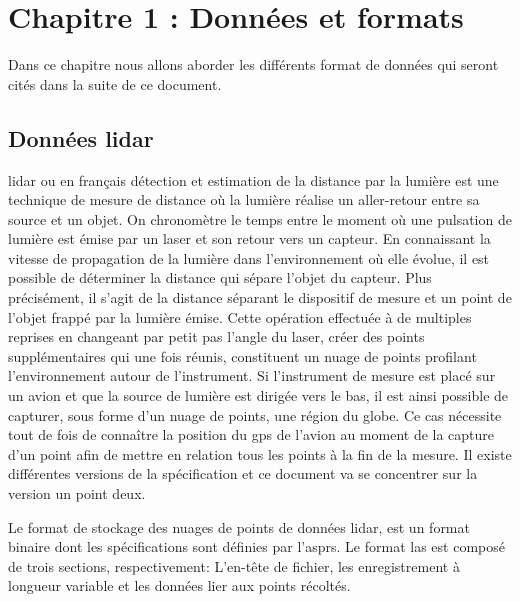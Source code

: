 \chapter{Chapitre 1 : Données et formats}


Dans ce chapitre nous allons aborder les différents format de données qui seront
cités dans la suite de ce document.

\section{Données lidar}

\gls{lidar} ou en français 
détection et estimation de la distance par la lumière est une technique de mesure de distance où la lumière réalise un 
aller-retour entre sa source et un objet. On chronomètre le temps entre le moment 
où une pulsation de lumière est émise par un laser et son retour vers un capteur.
En connaissant la vitesse de propagation de la lumière dans l’environnement où elle
évolue, il est possible de déterminer la distance qui sépare l’objet 
du capteur. Plus précisément, il s’agit de la distance séparant le dispositif de
mesure et un point de l’objet frappé par la lumière émise. 
Cette opération effectuée à de multiples reprises en changeant par petit pas 
l’angle du laser, créer des points supplémentaires qui une fois réunis,
constituent un nuage de points profilant l'environnement autour de l'instrument.
Si l'instrument de mesure est placé sur un avion et que la source de lumière est
dirigée vers le bas, il est ainsi possible de capturer, sous forme d'un nuage de
points, une région du globe. Ce cas nécessite tout de fois de connaître la position
du \gls{gps} de l'avion au moment de la capture d'un point afin de mettre en relation
tous les points à la fin de la mesure.
Il existe différentes versions de la spécification et ce document va se concentrer sur la version un point deux.



Le format de stockage des nuages de points de données \gls{lidar}, est un format
binaire dont les spécifications sont définies par l'\gls{asprs}.
Le format \gls{las} est composé de trois sections, respectivement:
L'en-tête de fichier, les enregistrement à longueur variable et les données lier aux points récoltés.

